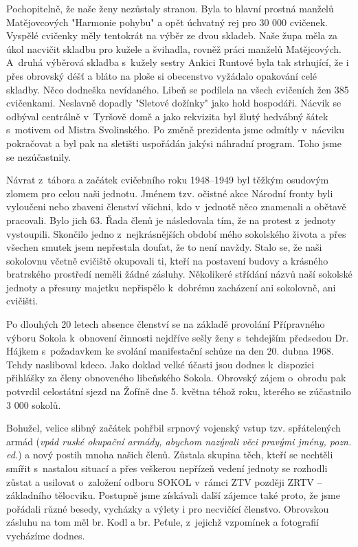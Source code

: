 \documentclass[a5paper, 11pt, twoside]{article}
\begin{document}
Pochopitelně, že naše ženy nezůstaly stranou. Byla to hlavní prostná
manželů Matějovcových "Harmonie pohybu" a opět úchvatný rej pro 30 000
cvičenek. Vyspělé cvičenky měly tentokrát na výběr ze dvou skladeb. Naše
župa měla za úkol nacvičit skladbu pro kužele a švihadla, rovněž práci
manželů Matějcových. A~druhá výběrová skladba s~kužely sestry Ankici
Runtové byla tak strhující, že i přes obrovský déšť a bláto na ploše si
obecenstvo vyžádalo opakování celé skladby. Něco dodneška nevídaného.
Libeň se podílela na všech cvičeních žen 385 cvičenkami. Neslavně
dopadly "Sletové dožínky" jako hold hospodáři. Nácvik se odbýval
centrálně v~Tyršově domě a jako rekvizita byl žlutý hedvábný šátek
s~motivem od Mistra Svolinského. Po změně prezidenta jsme odmítly
v~nácviku pokračovat a byl pak na sletišti uspořádán jakýsi náhradní
program. Toho jsme se nezúčastnily.

Návrat z~tábora a začátek cvičebního roku 1948--1949 byl
těžkým osudovým zlomem pro celou naši jednotu. Jménem tzv. očistné akce
Národní fronty byli vyloučeni nebo zbaveni členství všichni, kdo
v~jednotě něco znamenali a obětavě pracovali. Bylo jich 63. Řada členů je
následovala tím, že na protest z~jednoty vystoupili. Skončilo jedno
z~nejkrásnějších období mého sokolského života a přes všechen smutek jsem
nepřestala doufat, že to není navždy. Stalo se, že naši sokolovnu včetně
cvičiště okupovali ti, kteří na postavení budovy a krásného bratrského
prostředí neměli žádné zásluhy. Několikeré střídání názvů naší sokolské
jednoty a přesuny majetku nepřispělo k~dobrému zacházení ani sokolovně,
ani cvičišti.

Po dlouhých 20 letech absence členství se na základě provolání
Přípravného výboru Sokola k~obnovení činnosti nejdříve sešly ženy
s~tehdejším předsedou Dr. Hájkem s~požadavkem ke svolání manifestační
schůze na den 20. dubna 1968. Tehdy nasliboval kdeco. Jako doklad velké
účasti jsou dodnes k~dispozici přihlášky za členy obnoveného libeňského
Sokola. Obrovský zájem o~obrodu pak potvrdil celostátní sjezd na Žofíně
dne 5. května téhož roku, kterého se zúčastnilo 3 000 sokolů.

Bohužel, velice slibný začátek pohřbil srpnový vojenský vstup tzv.
spřátelených armád (\textit{vpád ruské okupační armády, abychom nazývali
věci pravými jmény, pozn. ed.}) a nový postih mnoha našich členů.
Zůstala skupina těch, kteří se nechtěli smířit s~nastalou situací a přes
veškerou nepřízeň vedení jednoty se rozhodli zůstat a usilovat
o~založení odboru SOKOL v~rámci ZTV později ZRTV -- základního tělocviku.
Postupně jsme získávali další zájemce také proto, že jsme pořádali různé
besedy, vycházky a výlety i pro necvičící členstvo. Obrovskou zásluhu na
tom měl br. Kodl a br. Peťule, z~jejichž vzpomínek a fotografií
vycházíme dodnes.
\end{document}
